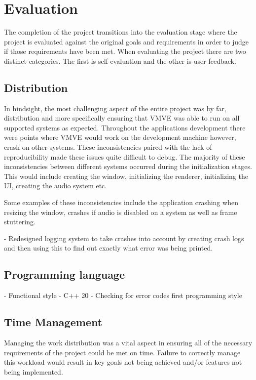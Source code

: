 \documentclass[11pt]{article}
\begin{document}
\section{Evaluation}
The completion of the project transitions into the evaluation stage where the
project is evaluated against the original goals and requirements in order to
judge if those requirements have been met. When evaluating the project there are
two distinct categories. The first is self evaluation and the other is user
feedback. 


\subsection{Distribution}
In hindsight, the most challenging aspect of the entire project was by far,
distribution and more specifically ensuring that VMVE was able to run on all
supported systems as expected. Throughout the applications development there
were points where VMVE would work on the development machine however, crash on
other systems. These inconsistencies paired with the lack of reproducibility
made these issues quite difficult to debug. The majority of these
inconsistencies between different systems occurred during the initialization
stages. This would include creating the window, initializing the renderer,
initializing the UI, creating the audio system etc.

Some examples of these inconsistencies include the application crashing when
resizing the window, crashes if audio is disabled on a system as well as frame
stuttering.

- Redesigned logging system to take crashes into account by creating crash logs
 and then using this to find out exactly what error was being printed.

\subsection{Programming language}
- Functional style
- C++ 20
- Checking for error codes first programming style

\subsection{Time Management}
Managing the work distribution was a vital aspect in ensuring all of the
necessary requirements of the project could be met on time. Failure to correctly 
manage this workload would result in key goals not being achieved and/or features
not being implemented.
\end{document}

